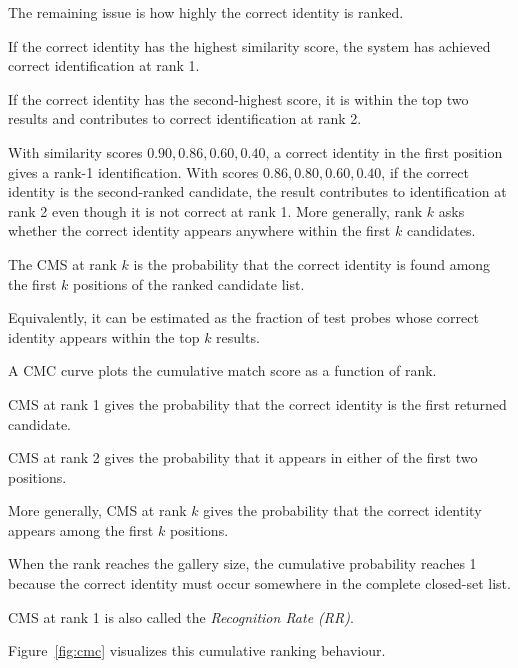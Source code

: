 \documentclass[11pt,a4paper,oneside]{report}
\begin{document}
The remaining issue is how highly the correct identity is ranked.

If the correct identity has the highest similarity score,
the system has achieved correct identification at rank 1.

If the correct identity has the second-highest score,
it is within the top two results and contributes to correct
identification at rank 2.

\Needspace{5cm}
\begin{examplebox}
With similarity scores \(0.90,0.86,0.60,0.40\), a correct identity in the
first position gives a rank-1 identification. With scores
\(0.86,0.80,0.60,0.40\), if the correct identity is the second-ranked
candidate, the result contributes to identification at rank 2 even though it
is not correct at rank 1. More generally, rank \(k\) asks whether the correct
identity appears anywhere within the first \(k\) candidates.
\end{examplebox}

\begin{metricbox}
The CMS at rank \(k\) is the probability that the correct identity is
found among the first \(k\) positions of the ranked candidate list.

Equivalently, it can be estimated as the fraction of test probes whose
correct identity appears within the top \(k\) results.
\end{metricbox}

\begin{metricbox}
A CMC curve plots the cumulative match score as a function of rank.

CMS at rank 1 gives the probability that the correct identity is the
first returned candidate.

CMS at rank 2 gives the probability that it appears in either of the
first two positions.

More generally, CMS at rank \(k\) gives the probability that the correct
identity appears among the first \(k\) positions.
\end{metricbox}

When the rank reaches the gallery size,
the cumulative probability reaches 1 because the correct identity must
occur somewhere in the complete closed-set list.

CMS at rank 1 is also called the \emph{Recognition Rate (RR)}.

Figure~\ref{fig:cmc} visualizes this cumulative ranking behaviour.
\end{document}
